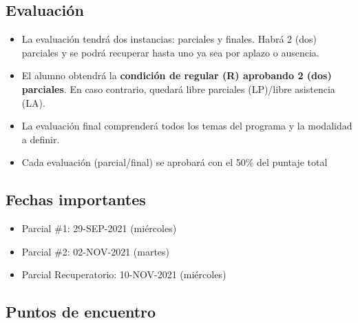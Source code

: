 \documentclass[
]{article}
\providecommand{\tightlist}{%
  \setlength{\itemsep}{0pt}\setlength{\parskip}{0pt}}
\begin{document}
\hypertarget{evaluaciuxf3n}{%
\subsection{Evaluación}\label{evaluaciuxf3n}}

\begin{itemize}
\tightlist
\item
  La evaluación tendrá dos instancias: parciales y finales. Habrá 2
  (dos) parciales y se podrá recuperar hasta uno ya sea por aplazo o
  ausencia.
\item
  El alumno obtendrá la \textbf{condición de regular (R) aprobando 2
  (dos) parciales}. En caso contrario, quedará libre parciales
  (LP)/libre asistencia (LA).
\item
  La evaluación final comprenderá todos los temas del programa y la
  modalidad a definir.
\item
  Cada evaluación (parcial/final) se aprobará con el 50\% del puntaje
  total
\end{itemize}

\hypertarget{fechas-importantes}{%
\subsection{Fechas importantes}\label{fechas-importantes}}

\begin{itemize}
\tightlist
\item
  Parcial \#1: 29-SEP-2021 (miércoles)
\item
  Parcial \#2: 02-NOV-2021 (martes)
\item
  Parcial Recuperatorio: 10-NOV-2021 (miércoles)
\end{itemize}

\hypertarget{puntos-de-encuentro}{%
\subsection{Puntos de encuentro}\label{puntos-de-encuentro}}
\end{document}
